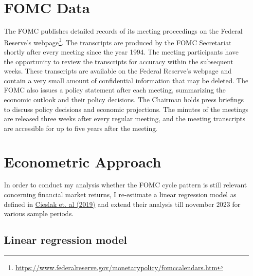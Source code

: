 \section{FOMC Data}

The FOMC publishes detailed records of its meeting proceedings on the Federal Reserve's webpage\footnote{\url{https://www.federalreserve.gov/monetarypolicy/fomccalendars.htm}}.  
The transcripts are produced by the FOMC Secretariat shortly after every meeting since the year 1994.
The meeting participants have the opportunity to review the transcripts for accuracy within the subsequent weeks. 
These transcripts are available on the Federal Reserve's webpage and contain a very small amount of confidential information that may be deleted. 
The FOMC also issues a policy statement after each meeting,  summarizing the economic outlook and their policy decisions. 
The Chairman holds press briefings to discuss policy decisions and economic projections. 
The minutes of the meetings are released three weeks after every regular meeting, and the meeting transcripts are accessible for up to five years after the meeting.

\section{Econometric Approach}

In order to conduct my analysis whether the FOMC cycle pattern is still relevant concerning financial market returns, I re-estimate a linear regression model as defined in \hyperref[item:cieslak_stock_2019]{Cieslak et. al (2019)} and extend their analysis till november 2023 for various sample periods.

\subsection{Linear regression model}

